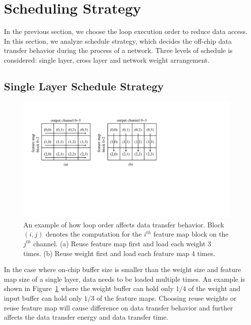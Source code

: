 \section{Scheduling Strategy}\label{sec:schedule}
In the previous section, we choose the loop execution order to reduce data access. In this section, we analyze schedule strategy, which decides the off-chip data transfer behavior during the process of a network. Three levels of schedule is considered: single layer, cross layer and network weight arrangement.

\subsection{Single Layer Schedule Strategy}

\begin{figure}[t]
  \centering
  \includegraphics[width=1\columnwidth]{fig/single_layer.pdf}
  \caption{An example of how loop order affects data transfer behavior. Block $(i, j)$ denotes the computation for the $i^{th}$ feature map block on the $j^{th}$ channel. (a) Reuse feature map first and load each weight 3 times. (b) Reuse weight first and load each feature map 4 times.}
  \label{fig:single_layer}
\end{figure}

In the case where on-chip buffer size is smaller than the weight size and feature map size of a single layer, data needs to be loaded multiple times. An example is shown in Figure~\ref{fig:single_layer} where the weight buffer can hold only $1/4$ of the weight and input buffer can hold only $1/3$ of the feature maps. Choosing reuse weights or reuse feature map will cause difference on data transfer behavior and further affects the data transfer energy and data transfer time.

